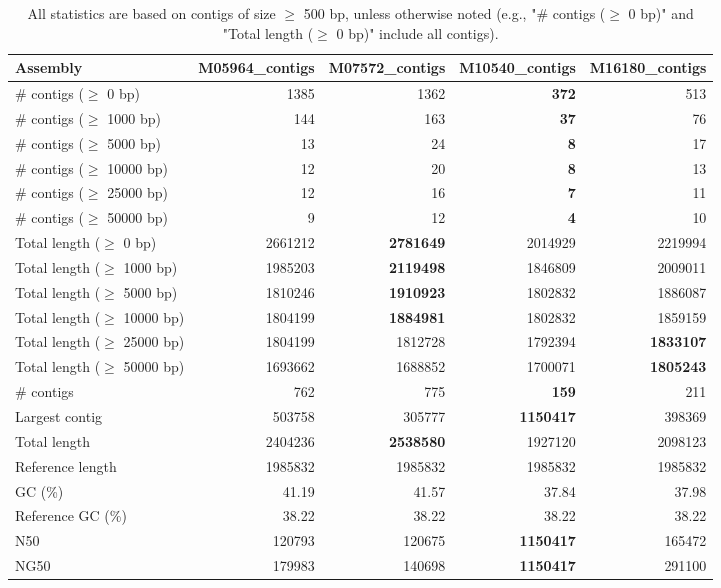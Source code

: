 \documentclass[12pt,a4paper]{article}
\begin{document}
\begin{table}[ht]
\begin{center}
\caption{All statistics are based on contigs of size $\geq$ 500 bp, unless otherwise noted (e.g., "\# contigs ($\geq$ 0 bp)" and "Total length ($\geq$ 0 bp)" include all contigs).}
\begin{tabular}{|l*{4}{|r}|}
\hline
Assembly & M05964\_contigs & M07572\_contigs & M10540\_contigs & M16180\_contigs \\ \hline
\# contigs ($\geq$ 0 bp) & 1385 & 1362 & {\bf 372} & 513 \\ \hline
\# contigs ($\geq$ 1000 bp) & 144 & 163 & {\bf 37} & 76 \\ \hline
\# contigs ($\geq$ 5000 bp) & 13 & 24 & {\bf 8} & 17 \\ \hline
\# contigs ($\geq$ 10000 bp) & 12 & 20 & {\bf 8} & 13 \\ \hline
\# contigs ($\geq$ 25000 bp) & 12 & 16 & {\bf 7} & 11 \\ \hline
\# contigs ($\geq$ 50000 bp) & 9 & 12 & {\bf 4} & 10 \\ \hline
Total length ($\geq$ 0 bp) & 2661212 & {\bf 2781649} & 2014929 & 2219994 \\ \hline
Total length ($\geq$ 1000 bp) & 1985203 & {\bf 2119498} & 1846809 & 2009011 \\ \hline
Total length ($\geq$ 5000 bp) & 1810246 & {\bf 1910923} & 1802832 & 1886087 \\ \hline
Total length ($\geq$ 10000 bp) & 1804199 & {\bf 1884981} & 1802832 & 1859159 \\ \hline
Total length ($\geq$ 25000 bp) & 1804199 & 1812728 & 1792394 & {\bf 1833107} \\ \hline
Total length ($\geq$ 50000 bp) & 1693662 & 1688852 & 1700071 & {\bf 1805243} \\ \hline
\# contigs & 762 & 775 & {\bf 159} & 211 \\ \hline
Largest contig & 503758 & 305777 & {\bf 1150417} & 398369 \\ \hline
Total length & 2404236 & {\bf 2538580} & 1927120 & 2098123 \\ \hline
Reference length & 1985832 & 1985832 & 1985832 & 1985832 \\ \hline
GC (\%) & 41.19 & 41.57 & 37.84 & 37.98 \\ \hline
Reference GC (\%) & 38.22 & 38.22 & 38.22 & 38.22 \\ \hline
N50 & 120793 & 120675 & {\bf 1150417} & 165472 \\ \hline
NG50 & 179983 & 140698 & {\bf 1150417} & 291100 \\ \hline

\end{tabular}
\end{center}
\end{table}
\end{document}

